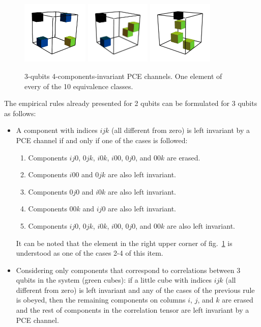 \documentclass[11pt,dvipsnames]{article} %
\newcommand{\fref}[1]{fig.~\ref{#1}}  \newcommand{\tref}[1]{table~\ref{#1}}
\newcommand{\1}{\mathds{1}}
\begin{document}
\begin{figure}[H]
	\hfill
	\includegraphics[height=3cm]{img/3q-4c-no-3}
	\hfill
	\includegraphics[height=3cm]{img/3q-4c-no-4}
	\hfill
	\includegraphics[height=3cm]{img/3q-4c-no-5}
	\hfill \hfill
	\caption{3-qubits 4-components-invariant PCE channels. 
	One element of every of the 10 equivalence classes.}
	\label{fig:QC-3q-4c}
\end{figure}
The empirical rules already presented for 2 qubits can be 
formulated for 3 qubits as follows:
\begin{itemize}
	\item A component with indices $ijk$ (all different from zero) is
	left invariant by a PCE channel if and only if 
	one of the cases is followed:
	\begin{enumerate}
		\item Components $ij0$, $0jk$, $i0k$, $i00$, $0j0$, and
		$00k$ are erased.
		\item Components $i00$ and $0jk$ are also left invariant.
		\item Components $0j0$ and $i0k$ are also left invariant.
		\item Components $00k$ and $ij0$ are also left invariant.
		\item Components $ij0$, $0jk$, $i0k$, $i00$, $0j0$, and
		$00k$ are also left invariant.
	\end{enumerate}
	It can be noted that the element in the right upper corner of 
	\fref{fig:QC-3q-4c} is understood as one of the cases 2-4 of this item.
	\item Considering only components that correspond to correlations between
	3 qubits in the system (green cubes): if a little cube 
	with indices $ijk$ (all different from zero) is left invariant 
	and any of the cases of the previous rule is obeyed, 
	then the remaining components on columns $i$, $j$, and $k$ are
	erased and the rest of components in the correlation tensor 
	are left invariant by a PCE channel. 
\end{itemize}
\end{document}
